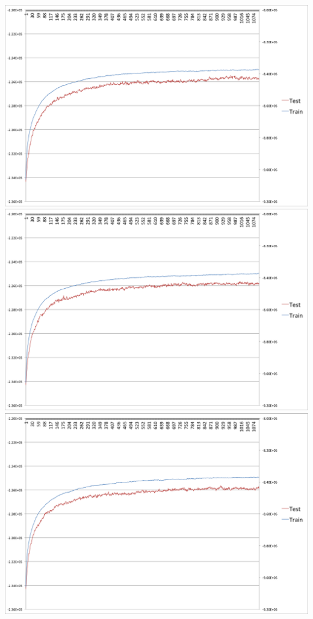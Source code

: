 \documentclass[12pt, letterpaper]{article}
\begin{document}
\begin{enumerate}[1.]
        \includegraphics[scale=0.5]{ml_graph_1a}\\
        \includegraphics[scale=0.5]{ml_graph_1b}\\
        \includegraphics[scale=0.5]{ml_graph_1c}\\


\end{enumerate}
\end{document}
